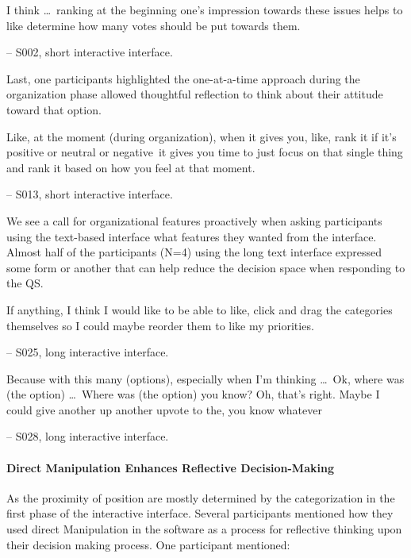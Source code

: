 \begin{displayquote}
I think \ldots\ ranking at the beginning one's impression towards these issues helps to like determine how many votes should be put towards them. 

\noindent \hfill -- S002, short interactive interface.
\end{displayquote}

Last, one participants highlighted the one-at-a-time approach during the organization phase allowed thoughtful reflection to think about their attitude toward that option.

\begin{displayquote}
Like, at the moment (during organization), when it gives you, like, rank it if it's positive or neutral or negative~\bracketellipsis it gives you time to just focus on that single thing and rank it based on how you feel at that moment.
    
    \noindent \hfill -- S013, short interactive interface.
\end{displayquote}

We see a call for organizational features proactively when asking participants using the text-based interface what features they wanted from the interface. Almost half of the participants (N=4) using the long text interface expressed some form or another that can help reduce the decision space when responding to the QS.

\begin{displayquote}
    If anything, I think I would like to be able to like, click and drag the categories themselves so I could maybe reorder them to like my priorities.
        
        \noindent \hfill -- S025, long interactive interface.
\end{displayquote}

\begin{displayquote}
    Because with this many (options), especially when I'm thinking \ldots\ Ok, where was (the option) \ldots\ Where was (the option) you know? Oh, that's right. Maybe I could give another up another upvote to the, you know whatever~\bracketellipsis
        
        \noindent \hfill -- S028, long interactive interface.
\end{displayquote}

\paragraph{Direct Manipulation Enhances Reflective Decision-Making}
As the proximity of position are mostly determined by the categorization in the first phase of the interactive interface. Several participants mentioned how they used direct Manipulation in the software as a process for reflective thinking upon their decision making process. One participant mentioned:

